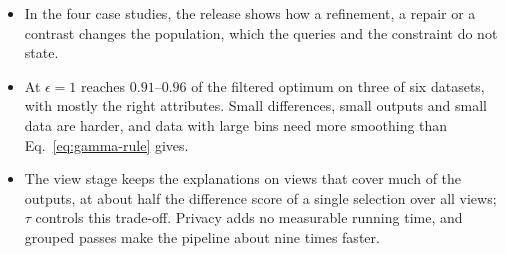 \begin{itemize}[leftmargin=*,itemsep=1pt,topsep=2pt]
  \item In the four case studies, the release shows how a refinement, a repair or a contrast changes the population, which the queries and the constraint do not state.
  \item At $\epsilon=1$ \sys{} reaches $0.91$--$0.96$ of the filtered optimum on three of six datasets, with mostly the right attributes. Small differences, small outputs and small data are harder, and data with large bins need more smoothing than Eq.~\eqref{eq:gamma-rule} gives.
  \item The view stage keeps the explanations on views that cover much of the outputs, at about half the difference score of a single selection over all views; $\tau$ controls this trade-off. Privacy adds no measurable running time, and grouped passes make the pipeline about nine times faster.
\end{itemize}
